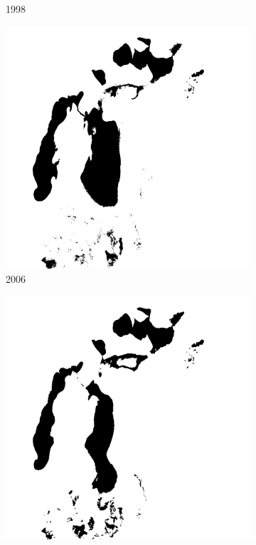 \documentclass[12pt,a4paper]{article}
\begin{document}
\begin{figure}
\begin{subfigure}[b]{0.19\textwidth}
        \caption{1998}
    \end{subfigure}
    \begin{subfigure}[b]{0.19\textwidth}
        \centering
        \includegraphics[width=\textwidth]{../img/2006w.jpg}
        \caption{2006}
    \end{subfigure}
    \begin{subfigure}[b]{0.19\textwidth}
        \centering
        \includegraphics[width=\textwidth]{../img/2010w.jpg}

\end{subfigure}
\end{figure}
\end{document}

